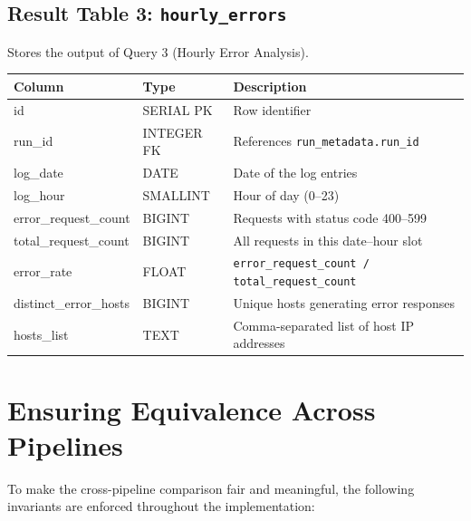 \documentclass[11pt,a4paper]{article}
\begin{document}
\subsection{Result Table 3: \texttt{hourly\_errors}}

Stores the output of Query 3 (Hourly Error Analysis).

\begin{schematable}
\begin{tabularx}{\linewidth}{@{} >{\ttfamily\small}l >{\small}l X @{}}
\toprule
\textnormal{\textbf{Column}} & \textbf{Type} & \textbf{Description} \\
\midrule
id                    & SERIAL PK  & Row identifier \\
run\_id               & INTEGER FK & References \texttt{run\_metadata.run\_id} \\
log\_date             & DATE       & Date of the log entries \\
log\_hour             & SMALLINT   & Hour of day (0--23) \\
error\_request\_count  & BIGINT     & Requests with status code 400--599 \\
total\_request\_count  & BIGINT     & All requests in this date--hour slot \\
error\_rate           & FLOAT      & \texttt{error\_request\_count / total\_request\_count} \\
distinct\_error\_hosts & BIGINT     & Unique hosts generating error responses \\
hosts\_list           & TEXT       & Comma-separated list of host IP addresses \\
\bottomrule
\end{tabularx}
\end{schematable}

\section{Ensuring Equivalence Across Pipelines}

To make the cross-pipeline comparison fair and meaningful, the following invariants are enforced throughout the implementation:
\end{document}
